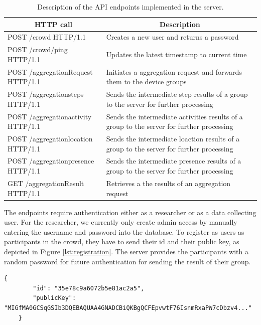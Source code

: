 \begin{table}[htbp]
\centering
  \begin{tabularx}{0.92\textwidth}{|l|X|}                                                                             \hline
        \multicolumn{1}{|c|}{\textbf{HTTP call}} & \multicolumn{1}{c|}{\textbf{Description}} \\ [0.5ex] 
        \hline
        POST /crowd HTTP/1.1 & Creates a new user and returns a password \\
        \hline
        POST /crowd/ping HTTP/1.1 & Updates the latest timestamp to current time \\
        \hline
        POST /aggregationRequest HTTP/1.1 & Initiates a aggregation request and forwards them to the device groups \\ 
        \hline
        POST /aggregationsteps HTTP/1.1 & Sends the intermediate step results of a group to the server for further processing  \\ 
        \hline
        POST /aggregationactivity HTTP/1.1 & Sends the intermediate activities results of a group to the server for further processing  \\ 
        \hline
        POST /aggregationlocation HTTP/1.1 & Sends the intermediate loaction results of a group to the server for further processing  \\ 
        \hline
        POST /aggregationpresence HTTP/1.1 & Sends the intermediate presence results of a group to the server for further processing  \\ 
        \hline
        GET /aggregationResult HTTP/1.1 & Retrieves a the results of an aggregation request \\ 
        \hline
  \end{tabularx}
  \caption{Description of the API endpoints implemented in the server.}
  \label{tab:rest}
\end{table}

The endpoints require authentication either as a researcher or as a data collecting user. For the researcher, we currently only create admin access by manually entering the username and password into the database. To register as users as participants in the crowd, they have to send their id and their public key, as depicted in Figure \ref{lst:registration}. The server provides the participants with a random password for future authentication for sending the result of their group.

\begin{lstlisting}[caption=Registration message sent to the server, label={lst:registration}]
    {
        "id": "35e78c9a6072b5e81ac2a5",
        "publicKey": "MIGfMA0GCSqGSIb3DQEBAQUAA4GNADCBiQKBgQCFEpvwtF76IsnmRxaPW7cDbzv4..."
    }
\end{lstlisting}

